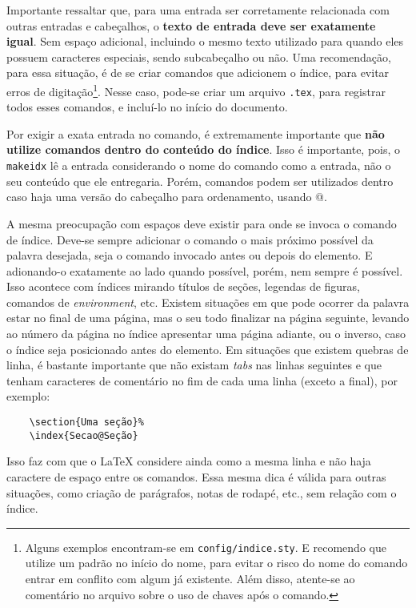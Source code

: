     Importante ressaltar que, para uma entrada ser corretamente relacionada com outras entradas e cabeçalhos, o \textbf{texto de entrada deve ser exatamente igual}. Sem espaço adicional, incluindo o mesmo texto utilizado para quando eles possuem caracteres especiais, sendo subcabeçalho\myIdxSubcabecalho{} ou não. Uma recomendação, para essa situação, é de se criar comandos que adicionem o índice, para evitar erros de digitação\footnote{Alguns exemplos encontram-se em \texttt{config/indice.sty}. E recomendo que utilize um padrão no início do nome, para evitar o risco do nome do comando entrar em conflito com algum já existente. Além disso, atente-se ao comentário no arquivo sobre o uso de chaves após o comando.}. Nesse caso, pode-se criar um arquivo \texttt{.tex}, para registrar todos esses comandos, e incluí-lo no início do documento. 
    
    Por exigir a exata entrada no comando, é extremamente importante que \textbf{não utilize comandos dentro do conteúdo do índice}. Isso é importante, pois, o \texttt{makeidx} lê a entrada considerando o nome do comando como a entrada, não o seu conteúdo que ele entregaria. Porém, comandos podem ser utilizados dentro caso haja uma versão do cabeçalho para ordenamento, usando @. 

    A mesma preocupação com espaços deve existir para onde se invoca o comando de índice. Deve-se sempre adicionar o comando o mais próximo possível da palavra desejada, seja o comando invocado antes ou depois do elemento. E adionando-o exatamente ao lado quando possível, porém, nem sempre é possível. Isso acontece com índices mirando títulos de seções, legendas de figuras, comandos de \textit{environment}, etc. Existem situações em que pode ocorrer da palavra estar no final de uma página, mas o seu todo finalizar na página seguinte, levando ao número da página no índice apresentar uma página adiante, ou o inverso, caso o índice seja posicionado antes do elemento. Em situações que existem quebras de linha, é bastante importante que não existam \textit{tabs} nas linhas seguintes e que tenham caracteres de comentário no fim de cada uma linha (exceto a final), por exemplo:
\begin{verbatim}
    \section{Uma seção}%
    \index{Secao@Seção}
\end{verbatim}%
Isso faz com que o \LaTeX{} considere ainda como a mesma linha e não haja caractere de espaço entre os comandos. Essa mesma dica é válida para outras situações, como criação de parágrafos, notas de rodapé, etc., sem relação com o índice.

